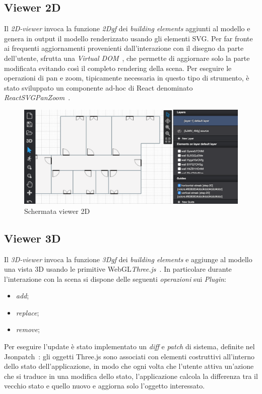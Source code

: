 \subsection{Viewer 2D}
Il \emph{2D-viewer} invoca la funzione \emph{2Dgf} dei \emph{building elements} aggiunti al modello e
genera in output il modello renderizzato usando gli elementi SVG.
Per far fronte ai frequenti aggiornamenti provenienti dall'interazione con il disegno da parte dell'utente,
sfrutta una \emph{Virtual DOM}~\cite{vdom}, che permette di aggiornare solo la parte modificata evitando così
il completo rendering della scena. Per eseguire le operazioni di pan e zoom, tipicamente necessaria in questo
tipo di strumento, è stato sviluppato un componente ad-hoc di React denominato \emph{ReactSVGPanZoom}~\cite{panzoom}.\\


\begin{figure}[htbp] %
   \centering
   \includegraphics[width=1\linewidth]{images/2d}
   \caption{Schermata viewer 2D}
   \label{fig:view2D}
\end{figure}
\newpage


\subsection{Viewer 3D}
Il \emph{3D-viewer} invoca la funzione \emph{3Dgf} dei \emph{building elements} e aggiunge al modello una vista 3D usando
le primitive WebGL\emph{Three.js}~\cite{threejs-site}.
In particolare durante l'interazione con la scena si dispone delle seguenti \textit{operazioni} sui \emph{Plugin}:
\begin{itemize}
  \item \emph{add};
  \item \emph{replace};
  \item \emph{remove};
\end{itemize}
Per eseguire l'update è stato implementato un \emph{diff} e \emph{patch} di
sistema, definite nel Jsonpatch~\cite{rfc6902}: gli oggetti Three.js sono associati con elementi costruttivi all'interno
dello stato dell'applicazione, in modo che ogni volta che l'utente attiva un'azione che si traduce in una modifica dello stato,
l'applicazione calcola la differenza tra il vecchio stato e quello nuovo e aggiorna solo l'oggetto interessato.\\


